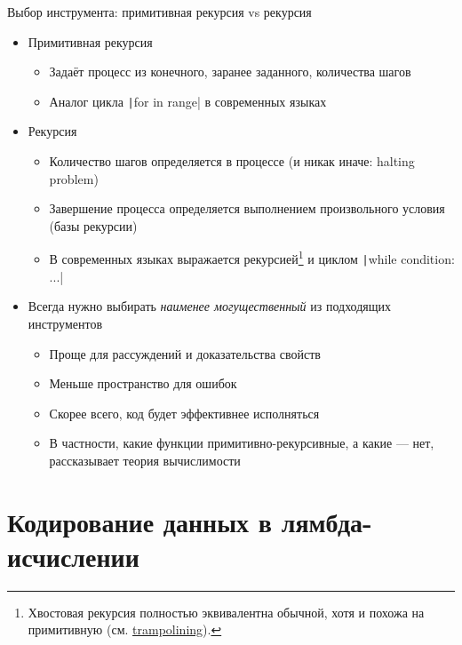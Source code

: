     \begin{frame}[fragile]{Выбор инструмента: примитивная рекурсия vs рекурсия \practicalslide}
        \begin{itemize}
            \item Примитивная рекурсия
            \begin{itemize}
                \item Задаёт процесс из конечного, заранее заданного, количества шагов
                \item Аналог цикла \texttt|for in range| в современных языках
            \end{itemize}
            \item Рекурсия
            \begin{itemize}
                \item Количество шагов определяется в процессе (и никак иначе: halting problem)
                \item Завершение процесса определяется выполнением произвольного условия (базы рекурсии)
                \item В современных языках выражается рекурсией\footnote{Хвостовая рекурсия полностью эквивалентна обычной, хотя и похожа на примитивную (см. \href{https://en.wikipedia.org/wiki/Trampoline\_(computing)\#High-level_programming}{\color{blue} trampolining}).} и циклом \texttt|while condition: ...|
            \end{itemize}
            \item Всегда нужно выбирать \emph{наименее могущественный} из подходящих инструментов
            \begin{itemize}
                \item Проще для рассуждений и доказательства свойств
                \item Меньше пространство для ошибок
                \item Скорее всего, код будет эффективнее исполняться
                \item В частности, какие функции примитивно-рекурсивные, а какие --- нет, рассказывает теория вычислимости
            \end{itemize}
        \end{itemize}
    \end{frame}


    \section{Кодирование данных в лямбда-исчислении}

